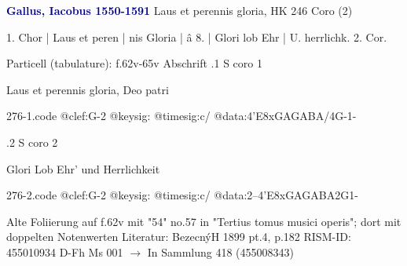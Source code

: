 \documentclass[twocolumn]{book}
\begin{document}
\newline \par \vspace{7pt} \textcolor{darkblue}{\textbf{Gallus, Iacobus  1550-1591}}
\newline Laus et perennis gloria, HK 246
\newline Coro (2)
\newline \begin{itshape}[f.62v, at left:] 1. Chor | Laus et peren | nis Gloria | â 8. | Glori lob Ehr | U. herrlichk. 2. Cor.\end{itshape} 
\newline \textcolor{darkblue}{}  Particell (tabulature): f.62v-65v
\newline Abschrift
.1  S coro 1
\newline \begin{footnotesize} Laus et perennis gloria, Deo patri \end{footnotesize}  
\begin{filecontents*}{276-1.code}
@clef:G-2
@keysig:
@timesig:c/
@data:4'E{8xGA}{GABA}/4G-1-
\end{filecontents*}
\newline
%
.2  S coro 2
\newline \begin{footnotesize} Glori Lob Ehr' und Herrlichkeit \end{footnotesize}  
\begin{filecontents*}{276-2.code}
@clef:G-2
@keysig:
@timesig:c/
@data:2--4'E{8xGAGA}{BA}2G1-
\end{filecontents*}
\newline
%
\newline Alte Foliierung auf f.62v mit "54"
\newline no.57 in "Tertius tomus musici operis"; dort mit doppelten Notenwerten
\newline Literatur: BezecnýH 1899  pt.4, p.182
\newline RISM-ID: 455010934
\newline D-Fh  Ms 001
\newline $\rightarrow$ In Sammlung 418 (455008343)
      
\end{document}
